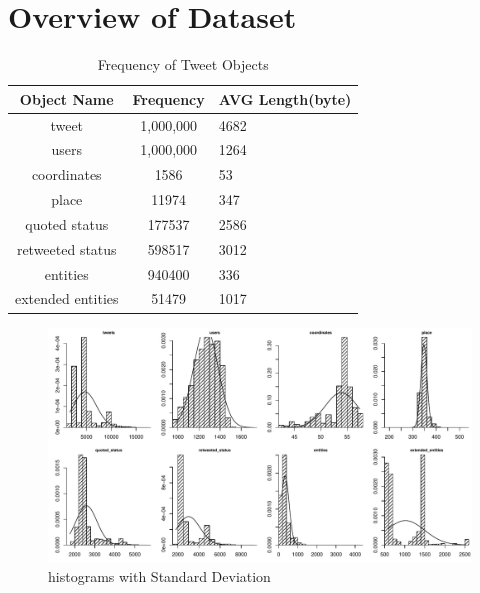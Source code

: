 \section{Overview of Dataset}

\begin{table}
	\centering
	\caption{Frequency of Tweet Objects}
	\begin{tabular}{|c|c|l|} \hline
		Object Name &Frequency&AVG Length(byte)\\ \hline
		tweet & 1,000,000 & 4682\\ \hline
		users & 1,000,000 & 1264\\ \hline
		coordinates & 1586 & 53\\ \hline
		place & 11974 & 347\\ \hline
		quoted status & 177537 & 2586\\ \hline
		retweeted status & 598517 & 3012\\ \hline
		entities & 940400 & 336\\ \hline
		extended entities & 51479 & 1017\\ \hline
		\hline\end{tabular}
\end{table}

\begin{figure}
	\centering
	\includegraphics[scale=0.7]{img/Data_Overview.pdf}
	\caption{histograms with Standard Deviation}
	\label{fig:fly}
\end{figure}
